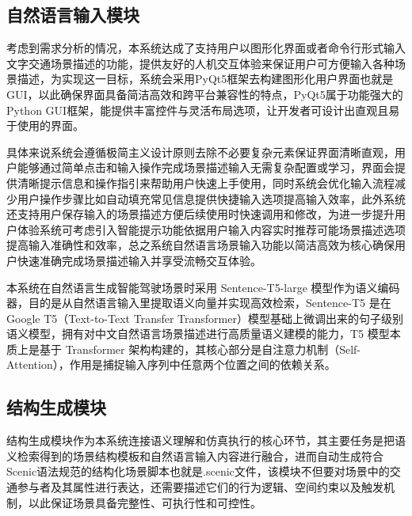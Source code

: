 \subsection{自然语言输入模块}
考虑到需求分析的情况，本系统达成了支持用户以图形化界面或者命令行形式输入文字交通场景描述的功能，提供友好的人机交互体验来保证用户可方便输入各种场景描述，为实现这一目标，系统会采用PyQt5框架去构建图形化用户界面也就是GUI，以此确保界面具备简洁高效和跨平台兼容性的特点，PyQt5属于功能强大的Python GUI框架，能提供丰富控件与灵活布局选项，让开发者可设计出直观且易于使用的界面。

具体来说系统会遵循极简主义设计原则去除不必要复杂元素保证界面清晰直观，用户能够通过简单点击和输入操作完成场景描述输入无需复杂配置或学习，界面会提供清晰提示信息和操作指引来帮助用户快速上手使用，同时系统会优化输入流程减少用户操作步骤比如自动填充常见信息提供快捷输入选项提高输入效率，此外系统还支持用户保存输入的场景描述方便后续使用时快速调用和修改，为进一步提升用户体验系统可考虑引入智能提示功能依据用户输入内容实时推荐可能场景描述选项提高输入准确性和效率，总之系统自然语言场景输入功能以简洁高效为核心确保用户快速准确完成场景描述输入并享受流畅交互体验。

本系统在自然语言生成智能驾驶场景时采用 Sentence-T5-large 模型作为语义编码器，目的是从自然语言输入里提取语义向量并实现高效检索，Sentence-T5 是在 Google T5（Text-to-Text Transfer Transformer）模型基础上微调出来的句子级别语义模型，拥有对中文自然语言场景描述进行高质量语义建模的能力，T5 模型本质上是基于 Transformer 架构构建的，其核心部分是自注意力机制（Self-Attention），作用是捕捉输入序列中任意两个位置之间的依赖关系。

\subsection{结构生成模块}

结构生成模块作为本系统连接语义理解和仿真执行的核心环节，其主要任务是把语义检索得到的场景结构模板和自然语言输入内容进行融合，进而自动生成符合Scenic语法规范的结构化场景脚本也就是.scenic文件，该模块不但要对场景中的交通参与者及其属性进行表达，还需要描述它们的行为逻辑、空间约束以及触发机制，以此保证场景具备完整性、可执行性和可控性。

